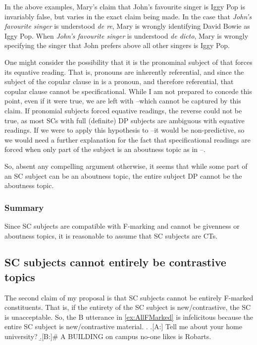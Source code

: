 \documentclass[
	letterpaper,
]{article}
\begin{document}
In the above examples, Mary's claim that John's favourite singer is Iggy Pop is invariably false, but varies in the exact claim being made.
In the case that \textit{John's favourite singer} is understood \textit{de re}, Mary is wrongly identifying David Bowie as Iggy Pop.
When \textit{John's favourite singer} is understood \textit{de dicto}, Mary is wrongly specifying the singer that John prefers above all other singers is Iggy Pop.

One might consider the possibility that it is the pronominal subject of \Last[a] that forces its equative reading.
That is, pronouns are inherently referential, and since the subject of the copular clause in \Last[a] is a pronoun, and therefore referential, that copular clause cannot be specificational. 
While I am not prepared to concede this point, even if it were true, we are left with \Last[b]--\Last[d] which cannot be captured by this claim.
If pronomial subjects forced equative readings, the reverse could not be true, as most SCs with full (definite) DP subjects are ambiguous with equative readings.
If we were to apply this hypothesis to \Last[b]--\Last[d] it would be non-predictive, so we would need a further explanation for the fact that specificational readings are forced when only part of the subject is an aboutness topic as in \Last[b]--\Last[d].

So, absent any compelling argument otherwise, it seems that while some part of an SC subject can be an aboutness topic, the entire subject DP cannot be the aboutness topic.

\subsubsection{Summary}
Since SC subjects are compatible with F-marking and cannot be givenness or aboutness topics, it is reasonable to assume that SC subjects are CTs.
\subsection{SC subjects cannot entirely be contrastive topics}
The second claim of my proposal is that SC subjects cannot be entirely F-marked constituents.
That is, if the entirety of the SC subject is new/contrastive, the SC is unacceptable.
So, the B utterance in \ref{ex:AllFMarked} is infelicitous because the entire SC subject is new/contrastive material.
\ex.\label{ex:AllFMarked}
\a.[A:] Tell me about your home university?
\b.[B:]\# A BUILDING on campus no-one likes is Robarts.
\end{document}
